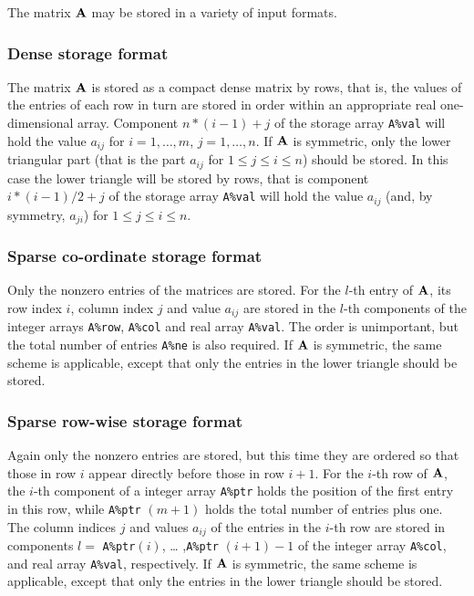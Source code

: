 \documentclass{galahad}
\begin{document}

\galmatrix

The matrix ${\mathbf{A}}$ may be stored in a variety of input formats.

\subsubsection{Dense storage format}\label{dense}
The matrix ${\mathbf{A}}$ is stored as a compact 
dense matrix by rows, that is, the values of the entries of each row in turn are
stored in order within an appropriate real one-dimensional array.
Component $n \ast (i-1) + j$ of the storage array {\tt A\%val} will hold the 
value $a_{ij}$ for $i = 1, \ldots , m$, $j = 1, \ldots , n$.
If ${\mathbf{A}}$ is symmetric, only the lower triangular part (that is the part 
$a_{ij}$ for $1 \leq j \leq i \leq n$) should be stored.  In this case
the lower triangle will be stored by rows, that is 
component $i \ast (i-1)/2 + j$ of the storage array {\tt A\%val}  
will hold the value $a_{ij}$ (and, by symmetry, $a_{ji}$)
for $1 \leq j \leq i \leq n$.

\subsubsection{Sparse co-ordinate storage format}\label{coordinate}
Only the nonzero entries of the matrices are stored. For the $l$-th
entry of ${\mathbf{A}}$, its row index $i$, column index $j$ and value
$a_{ij}$ are stored in the $l$-th components of the integer arrays
{\tt A\%row}, {\tt A\%col} and real array {\tt A\%val}.  The order is
unimportant, but the total number of entries {\tt A\%ne} is also
required.  If ${\mathbf{A}}$ is symmetric, the same scheme is applicable,
except that only the entries in the lower triangle should be stored.

\subsubsection{Sparse row-wise storage format}\label{rowwise}
Again only the nonzero entries are stored, but this time they are
ordered so that those in row $i$ appear directly before those in row
$i+1$. For the $i$-th row of ${\mathbf{A}}$, the $i$-th component of a integer
array {\tt A\%ptr} holds the position of the first entry in this row,
while {\tt A\%ptr} $(m+1)$ holds the total number of entries plus one.
The column indices $j$ and values $a_{ij}$ of the entries in the
$i$-th row are stored in components $l =$ {\tt A\%ptr}$(i)$, \ldots
,{\tt A\%ptr} $(i+1)-1$ of the integer array {\tt A\%col}, and real
array {\tt A\%val}, respectively.  If ${\mathbf{A}}$ is symmetric, the same
scheme is applicable, except that only the entries in the lower
triangle should be stored.
\end{document}
